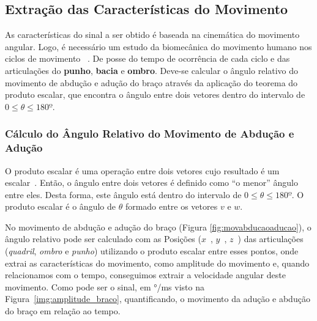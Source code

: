 \subsection{Extração das Características do Movimento} \label{sec:extracao_caracteristcas}
As características do sinal a ser obtido é baseada na cinemática do movimento angular. Logo, é necessário um estudo da biomecânica do movimento humano nos ciclos de movimento ~\cite{hamill1999bases}. De posse do tempo de ocorrência de cada ciclo e das articulações do \textbf{punho}, \textbf{bacia} e \textbf{ombro}. Deve-se calcular o ângulo relativo do movimento de abdução e adução do braço através da aplicação do teorema do produto escalar, que encontra o ângulo entre dois vetores dentro do intervalo de $0 \leq \theta \leq 180º$.

\subsubsection{Cálculo do Ângulo Relativo do Movimento de Abdução e Adução}\label{section:movimento_abducao}
O produto escalar é uma operação entre dois vetores cujo resultado é um escalar~\cite{algebra90}. Então, o ângulo entre dois vetores é definido como ``o menor'' ângulo entre eles. Desta forma, este ângulo está dentro do intervalo de $0 \leq \theta \leq 180º $. O produto escalar é o ângulo de $ \theta$ formado entre os vetores $ v $ e $ w $.


% 
% 

No movimento de abdução e adução do braço (Figura \ref{fig:movabducaoaducao}), o ângulo relativo pode ser calculado com as Posições ($ x $\ ,  $ y $\ , $ z $\ ) das articulações (\textit{quadril}, \textit{ombro} e \textit{punho}) utilizando o produto escalar entre esses pontos, onde extrai as características do movimento, como amplitude do movimento e, quando relacionamos com o tempo, conseguimos extrair a velocidade angular deste movimento. Como pode ser o sinal, em °/ms visto na Figura~\ref{img:amplitude_braco}, quantificando, o movimento da adução e abdução do braço em relação ao tempo.

